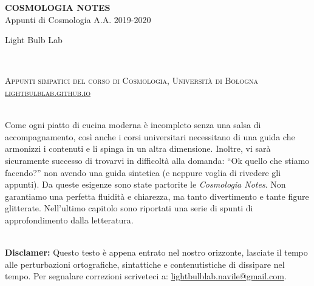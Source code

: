 \documentclass[11pt,fleqn]{book} %
\begin{document}

\begingroup
\thispagestyle{empty}
\centering
\vspace*{5cm}
\par\normalfont\fontsize{35}{35}\sffamily\selectfont
\textbf{COSMOLOGIA NOTES}\\
{\LARGE Appunti di Cosmologia A.A. 2019-2020}\par %
\vspace*{1cm}
{\Huge Light Bulb Lab}\par %
\endgroup


\newpage
~\vfill
\thispagestyle{empty}


\noindent \textsc{Appunti simpatici del corso di Cosmologia, Università di Bologna} \\

\noindent \textsc{\href{https://lightbulblab.github.io}{lightbulblab.github.io}} \\ %

~\vfill

\noindent Come ogni piatto di cucina moderna è incompleto senza una salsa di accompagnamento, così anche i corsi universitari necessitano di una guida che armonizzi i contenuti e li spinga in un altra dimensione. Inoltre, vi sarà sicuramente successo di trovarvi in difficoltà alla domanda: ``Ok quello che stiamo facendo?'' non avendo una guida sintetica (e neppure voglia di rivedere gli appunti). Da queste esigenze sono state partorite le \textit{Cosmologia Notes}. Non garantiamo una perfetta fluidità e chiarezza, ma tanto divertimento e tante figure glitterate. Nell'ultimo capitolo sono riportati una serie di spunti di approfondimento dalla letteratura.  \\ %

~\vfill

\noindent \textbf{Disclamer:} Questo testo è appena entrato nel nostro orizzonte, lasciate il tempo alle perturbazioni ortografiche, sintattiche e contenutistiche di dissipare nel tempo. Per segnalare correzioni scriveteci a: \href{mailto:lightbulblab.navile@gmail.com}{lightbulblab.navile@gmail.com}. \\
\end{document}
